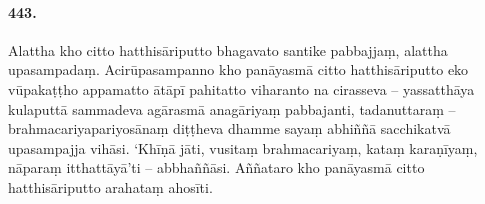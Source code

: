 \paragraph{443.} Alattha kho citto hatthisāriputto bhagavato santike pabbajjaṃ, alattha upasampadaṃ. Acirūpasampanno kho panāyasmā citto hatthisāriputto eko vūpakaṭṭho appamatto ātāpī pahitatto viharanto na cirasseva – yassatthāya kulaputtā sammadeva agārasmā anagāriyaṃ pabbajanti, tadanuttaraṃ – brahmacariyapariyosānaṃ diṭṭheva dhamme sayaṃ abhiññā sacchikatvā upasampajja vihāsi. ‘Khīṇā jāti, vusitaṃ brahmacariyaṃ, kataṃ karaṇīyaṃ, nāparaṃ itthattāyā’ti – abbhaññāsi. Aññataro kho panāyasmā citto hatthisāriputto arahataṃ ahosīti.

